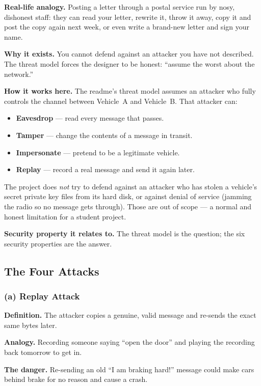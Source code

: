 \documentclass[11pt,a4paper]{report}
\begin{document}
\textbf{Real-life analogy.} Posting a letter through a postal service run by
nosy, dishonest staff: they can read your letter, rewrite it, throw it away,
copy it and post the copy again next week, or even write a brand-new letter and
sign your name.

\textbf{Why it exists.} You cannot defend against an attacker you have not
described. The threat model forces the designer to be honest: ``assume the worst
about the network.''

\textbf{How it works here.} The readme's threat model assumes an attacker who
fully controls the channel between Vehicle~A and Vehicle~B. That attacker can:
\begin{itemize}
  \item \textbf{Eavesdrop} --- read every message that passes.
  \item \textbf{Tamper} --- change the contents of a message in transit.
  \item \textbf{Impersonate} --- pretend to be a legitimate vehicle.
  \item \textbf{Replay} --- record a real message and send it again later.
\end{itemize}
The project does \emph{not} try to defend against an attacker who has stolen a
vehicle's secret private key files from its hard disk, or against denial of
service (jamming the radio so no message gets through). Those are out of scope
--- a normal and honest limitation for a student project.

\textbf{Security property it relates to.} The threat model is the question;
the six security properties are the answer.

\subsection{The Four Attacks}

\subsubsection*{(a) Replay Attack}
\textbf{Definition.} The attacker copies a genuine, valid message and re-sends
the exact same bytes later.

\textbf{Analogy.} Recording someone saying ``open the door'' and playing the
recording back tomorrow to get in.

\textbf{The danger.} Re-sending an old ``I am braking hard!'' message could make
cars behind brake for no reason and cause a crash.
\end{document}
